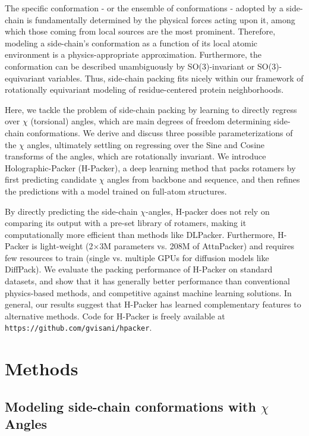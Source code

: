 The specific conformation - or the ensemble of conformations - adopted by a side-chain is fundamentally
determined by the physical forces acting upon it, among which those coming from local sources are the
most prominent. Therefore, modeling a side-chain's conformation as a function of its local atomic environment
is a physics-appropriate approximation. Furthermore, the conformation can be described unambiguously by 
SO(3)-invariant or SO(3)-equivariant variables. Thus, side-chain packing fits nicely within our framework of
rotationally equivariant modeling of residue-centered protein neighborhoods.

Here, we tackle the problem of side-chain packing by learning to directly regress over $\chi$
(torsional) angles, which are main degrees of freedom determining side-chain conformations. We
derive and discuss three possible parameterizations of the $\chi$ angles, ultimately settling on
regressing over the Sine and Cosine transforms of the angles, which are rotationally invariant. We
introduce Holographic-Packer (H-Packer), a deep learning method that packs rotamers by first
predicting candidate $\chi$ angles from backbone and sequence, and then refines the predictions
with a model trained on full-atom structures.

By directly predicting the side-chain $\chi$-angles, H-packer does not rely on comparing its output
with a pre-set library of rotamers, making it computationally more efficient than methods like
DLPacker. Furthermore, H-Packer is light-weight (2$\times$3M parameters vs. 208M of AttnPacker) and
requires few resources to train (single vs. multiple GPUs for diffusion models like DiffPack). We
evaluate the packing performance of H-Packer on standard datasets, and show that it has generally
better performance than conventional physics-based methods, and competitive against machine
learning solutions. In general, our results suggest that H-Packer has learned complementary
features to alternative methods.
Code for H-Packer is freely available at \texttt{https://github.com/gvisani/hpacker}.



\section{Methods}

\subsection{Modeling side-chain conformations with $\chi$ Angles}

